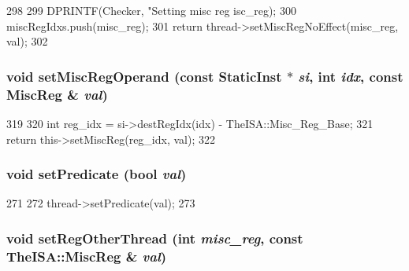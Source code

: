 \begin{DoxyCode}
298     {
299         DPRINTF(Checker, "Setting misc reg %
      isc_reg);
300         miscRegIdxs.push(misc_reg);
301         return thread->setMiscRegNoEffect(misc_reg, val);
302     }
\end{DoxyCode}
\hypertarget{classCheckerCPU_a6cfad8f780bab7feb893941cb0d46160}{
\subsubsection[{setMiscRegOperand}]{\setlength{\rightskip}{0pt plus 5cm}void setMiscRegOperand (const {\bf StaticInst} $\ast$ {\em si}, \/  int {\em idx}, \/  const {\bf MiscReg} \& {\em val})}}
\label{classCheckerCPU_a6cfad8f780bab7feb893941cb0d46160}



\begin{DoxyCode}
319     {
320         int reg_idx = si->destRegIdx(idx) - TheISA::Misc_Reg_Base;
321         return this->setMiscReg(reg_idx, val);
322     }
\end{DoxyCode}
\hypertarget{classCheckerCPU_a137a8c6cced89c2ff8387900439436b4}{
\subsubsection[{setPredicate}]{\setlength{\rightskip}{0pt plus 5cm}void setPredicate (bool {\em val})}}
\label{classCheckerCPU_a137a8c6cced89c2ff8387900439436b4}



\begin{DoxyCode}
271     {
272         thread->setPredicate(val);
273     }
\end{DoxyCode}
\hypertarget{classCheckerCPU_af05ac53fdafd8a612ca89f90b0c12910}{
\subsubsection[{setRegOtherThread}]{\setlength{\rightskip}{0pt plus 5cm}void setRegOtherThread (int {\em misc\_\-reg}, \/  const TheISA::MiscReg \& {\em val})}}
\label{classCheckerCPU_af05ac53fdafd8a612ca89f90b0c12910}



